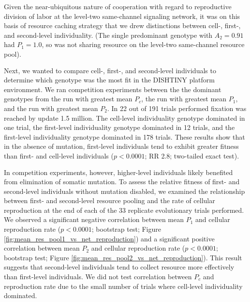 Given the near-ubiquitous nature of cooperation with regard to reproductive division of labor at the level-two same-channel signaling network, it was on this basis of resource caching strategy that we drew distinctions between cell-, first-, and second-level individuality.
(The single predominant genotype with $A_2 = 0.91$ had $P_1 = 1.0$, so was not sharing resource on the level-two same-channel resource pool).

Next, we wanted to compare cell-, first-, and second-level individuals to determine which genotype was the most fit in the DISHTINY platform environment.
We ran competition experiments between the the dominant genotypes from the run with greatest mean $P_{c}$, the run with greatest mean $P_1$, and the run with greatest mean $P_2$.
In 22 out of 191 trials performed fixation was reached by update 1.5 million.  The cell-level individuality genotype dominated in one trial, the first-level individuality genotype dominated in 12 trials, and the first-level individuality genotype dominated in 178 trials.
These results show that in the absence of mutation, first-level individuals tend to exhibit greater fitness than first- and cell-level individuals ($p < 0.0001$; RR 2.8; two-tailed exact test).



In competition experiments, however, higher-level individuals likely benefited from elimination of somatic mutation.
To assess the relative fitness of first- and second-level individuals without mutation disabled, we examined the relationship between first- and second-level resource pooling and the rate of cellular reproduction at the end of each of the 33 replicate evolutionary trials performed.
We observed a significant negative correlation between mean $P_1$ and cellular reproduction rate ($p < 0.0001$; bootstrap test; Figure \ref{fig:mean_res_pool1_vs_net_reproduction}) and a significant positive correlation between mean $P_2$ and cellular reproduction rate ($p < 0.0001$; bootstrap test; Figure \ref{fig:mean_res_pool2_vs_net_reproduction}).
This result suggests that second-level individuals tend to collect resource more effectively than first-level individuals.
We did not test correlation between $P_{c}$ and reproduction rate due to the small number of trials where cell-level individuality dominated.



